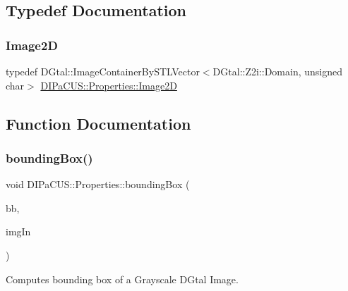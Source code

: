 \subsection{Typedef Documentation}
\mbox{\label{namespaceDIPaCUS_1_1Properties_aa6a61f89ec9c6c464ab0c0755f92e7fc}} 
\subsubsection{\texorpdfstring{Image2D}{Image2D}}
{\footnotesize\ttfamily typedef D\+Gtal\+::\+Image\+Container\+By\+S\+T\+L\+Vector$<$D\+Gtal\+::\+Z2i\+::\+Domain, unsigned char$>$ \hyperlink{namespaceDIPaCUS_1_1Properties_aa6a61f89ec9c6c464ab0c0755f92e7fc}{D\+I\+Pa\+C\+U\+S\+::\+Properties\+::\+Image2D}}



\subsection{Function Documentation}
\mbox{\label{namespaceDIPaCUS_1_1Properties_a17d4f21d5117ab744ee1b17f36dd8878}} 
\subsubsection{\texorpdfstring{bounding\+Box()}{boundingBox()}\hspace{0.1cm}{\footnotesize\ttfamily [1/2]}}
{\footnotesize\ttfamily void D\+I\+Pa\+C\+U\+S\+::\+Properties\+::bounding\+Box (\begin{DoxyParamCaption}\item[{\hyperlink{structDIPaCUS_1_1Properties_1_1BoundingBox}{Bounding\+Box} \&}]{bb,  }\item[{const \hyperlink{namespaceDIPaCUS_1_1Properties_aa6a61f89ec9c6c464ab0c0755f92e7fc}{Image2D} \&}]{img\+In }\end{DoxyParamCaption})}



Computes bounding box of a Grayscale D\+Gtal Image. 

